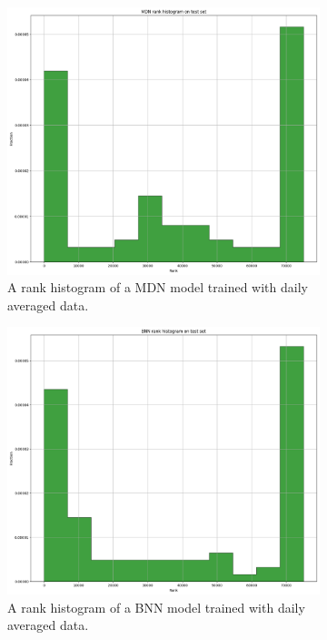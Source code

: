 \documentclass[12pt,a4paper,twoside]{scrartcl}
\numberwithin{equation}{section}
\newcounter{mypagecount}%
\newenvironment{interlude}{%
  \clearpage
  \setcounter{mypagecount}{\value{page}}%
  \thispagestyle{empty}%
  \pagestyle{empty}%
}{%
  \clearpage
  \setcounter{page}{\value{mypagecount}}%
}
\begin{document}
\begin{interlude}
\begin{appendices}
    \begin{figure}[h!]
      \centering
      \begin{subfigure}[t]{0.49\textwidth}
        \includegraphics[width=\textwidth,height=0.7\textwidth]{figures/model_plots/mdn-rank-1d}%
        \caption{A rank histogram of a MDN model trained with daily averaged data.}
      \end{subfigure}
      \begin{subfigure}[t]{0.49\textwidth}
        \includegraphics[width=\textwidth,height=0.7\textwidth]{figures/model_plots/bnn-rank-1d}%
        \caption{A rank histogram of a BNN model trained with daily averaged data.}
      \end{subfigure}
      \caption[Rank histograms (daily averaged data)]{}\label{fig:rank-1d}

\end{figure}
\end{appendices}
\end{interlude}
\end{document}
